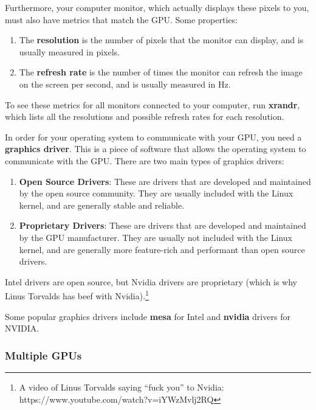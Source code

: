 \documentclass{article}
\begin{document}
    \begin{definition}[Monitor]
      Furthermore, your computer monitor, which actually displays these pixels to you, must also have metrics that match the GPU. Some properties: 
      \begin{enumerate} 
        \item The \textbf{resolution} is the number of pixels that the monitor can display, and is usually measured in pixels. 
        \item The \textbf{refresh rate} is the number of times the monitor can refresh the image on the screen per second, and is usually measured in Hz. 
      \end{enumerate}
      To see these metrics for all monitors connected to your computer, run \textbf{xrandr}, which lists all the resolutions and possible refresh rates for each resolution. 
    \end{definition}

    \begin{definition}
      In order for your operating system to communicate with your GPU, you need a \textbf{graphics driver}. This is a piece of software that allows the operating system to communicate with the GPU. There are two main types of graphics drivers:
      \begin{enumerate} 
        \item \textbf{Open Source Drivers}: These are drivers that are developed and maintained by the open source community. They are usually included with the Linux kernel, and are generally stable and reliable. 
        \item \textbf{Proprietary Drivers}: These are drivers that are developed and maintained by the GPU manufacturer. They are usually not included with the Linux kernel, and are generally more feature-rich and performant than open source drivers. 
      \end{enumerate}
    Intel drivers are open source, but Nvidia drivers are proprietary (which is why Linus Torvalds has beef with Nvidia).\footnote{A video of Linus Torvalds saying ``fuck you'' to Nvidia: https://www.youtube.com/watch?v=iYWzMvlj2RQ}
    \end{definition}

    Some popular graphics drivers include \textbf{mesa} for Intel and \textbf{nvidia} drivers for NVIDIA. 

    \subsubsection{Multiple GPUs} 
\end{document}
